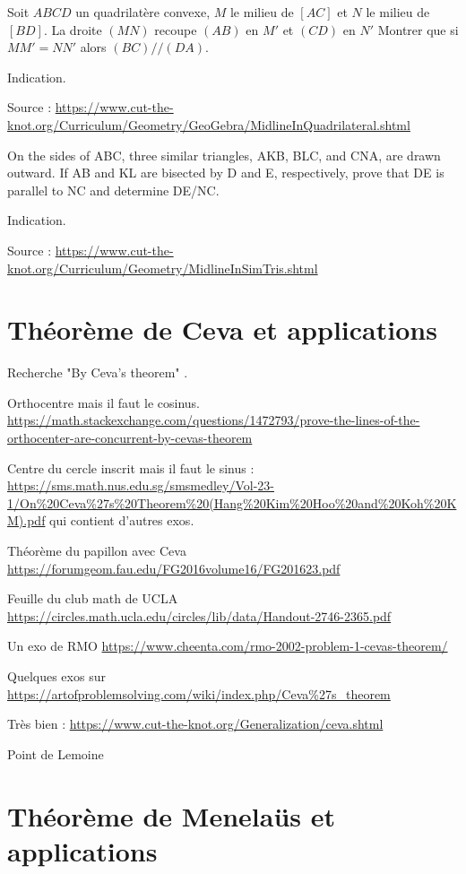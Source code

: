 \begin{exo}
Soit $ABCD$ un quadrilatère convexe, $M$ le milieu de $[AC]$ et $N$ le milieu de $[BD]$.
La droite $(MN)$ recoupe $(AB)$ en $M'$ et $(CD)$ en $N'$
Montrer que si $MM' = NN'$ alors $(BC)//(DA)$.
\begin{hint}
Indication.
\end{hint}
\begin{sol}
Source : \url{https://www.cut-the-knot.org/Curriculum/Geometry/GeoGebra/MidlineInQuadrilateral.shtml}
\end{sol}
\end{exo}

\begin{exo}
On the sides of ABC, three similar triangles, AKB, BLC, and CNA, are drawn outward. If AB and KL are bisected by D and E, respectively, prove that DE is parallel to NC and determine DE/NC.
\begin{hint}
Indication.
\end{hint}
\begin{sol}
Source : \url{https://www.cut-the-knot.org/Curriculum/Geometry/MidlineInSimTris.shtml}
\end{sol}
\end{exo}


\section{Théorème de Ceva et applications}

Recherche "By Ceva's theorem" .

Orthocentre mais il faut le cosinus. \url{https://math.stackexchange.com/questions/1472793/prove-the-lines-of-the-orthocenter-are-concurrent-by-cevas-theorem}

Centre du cercle inscrit mais il faut le sinus : \url{https://sms.math.nus.edu.sg/smsmedley/Vol-23-1/On%20Ceva%27s%20Theorem%20(Hang%20Kim%20Hoo%20and%20Koh%20KM).pdf} qui contient d'autres exos.

Théorème du papillon avec Ceva \url{https://forumgeom.fau.edu/FG2016volume16/FG201623.pdf}

Feuille du club math de UCLA \url{https://circles.math.ucla.edu/circles/lib/data/Handout-2746-2365.pdf}


Un exo de RMO \url{https://www.cheenta.com/rmo-2002-problem-1-cevas-theorem/}

Quelques exos sur \url{https://artofproblemsolving.com/wiki/index.php/Ceva%27s_theorem}

Très bien : \url{https://www.cut-the-knot.org/Generalization/ceva.shtml}

Point de Lemoine




\section{Théorème de Menelaüs et applications}





\indications
\correction



